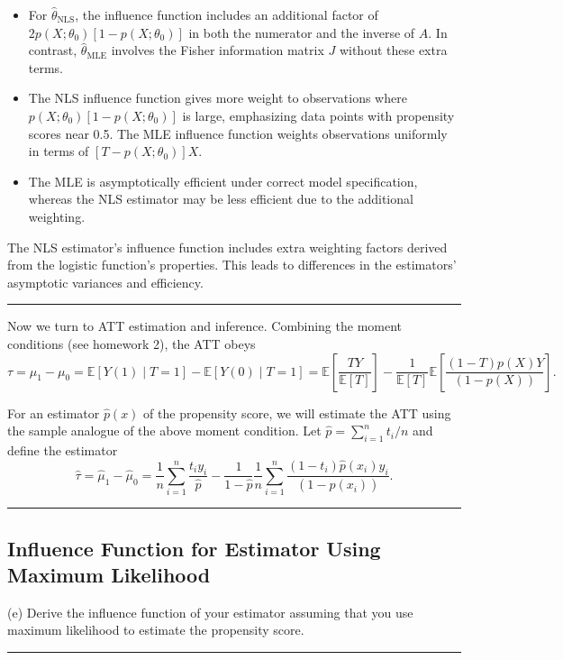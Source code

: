 \documentclass{article}
\newenvironment{colorparagraph}[1]{\par\color{#1}}{\par}
\begin{document}
\begin{itemize}
    \item For \( \hat{\theta}_{\text{NLS}} \), the influence function includes an additional factor of \( 2 p(X; \theta_0) [1 - p(X; \theta_0)] \) in both the numerator and the inverse of \( A \). In contrast, \( \hat{\theta}_{\text{MLE}} \) involves the Fisher information matrix \( J \) without these extra terms.
    \item The NLS influence function gives more weight to observations where \( p(X; \theta_0) [1 - p(X; \theta_0)] \) is large, emphasizing data points with propensity scores near 0.5. The MLE influence function weights observations uniformly in terms of \( [T - p(X; \theta_0)] X \).
    \item The MLE is asymptotically efficient under correct model specification, whereas the NLS estimator may be less efficient due to the additional weighting.
\end{itemize}

The NLS estimator's influence function includes extra weighting factors derived from the logistic function's properties. This leads to differences in the estimators' asymptotic variances and efficiency.

\begin{colorparagraph}{questioncolor}
\rule{\textwidth}{0.5pt}
Now we turn to ATT estimation and inference.
Combining the moment conditions (see homework 2), the ATT obeys
\[
\tau = \mu_1 - \mu_0 = \mathbb{E}[Y(1) \mid T = 1] - \mathbb{E}[Y(0) \mid T = 1] = \mathbb{E} \left[\frac{TY}{\mathbb{E}[T]} \right] - \frac{1}{\mathbb{E}[T]} \mathbb{E} \left[ \frac{(1 - T) p(X) Y}{(1 - p(X))} \right].
\]

For an estimator \( \hat{p}(x) \) of the propensity score, we will estimate the ATT using the sample analogue of the above moment condition.
Let \( \hat{p} = \sum_{i=1}^n t_i / n \) and define the estimator
\[
\hat{\tau} = \hat{\mu}_1 - \hat{\mu}_0 = \frac{1}{n} \sum_{i=1}^n \frac{t_i y_i}{\hat{p}} - \frac{1}{1 - \hat{p}} \frac{1}{n} \sum_{i=1}^n \frac{(1 - t_i) \hat{p}(x_i) y_i}{(1 - \hat{p}(x_i))}.
\]
\end{colorparagraph}

\begin{colorparagraph}{questioncolor}
\label{q1e}
\rule{\textwidth}{0.5pt}
\subsection{Influence Function for Estimator Using Maximum Likelihood}
(e) Derive the influence function of your estimator assuming that you use maximum likelihood to estimate the propensity score.

\rule{\textwidth}{0.5pt}
\end{colorparagraph}
\end{document}
